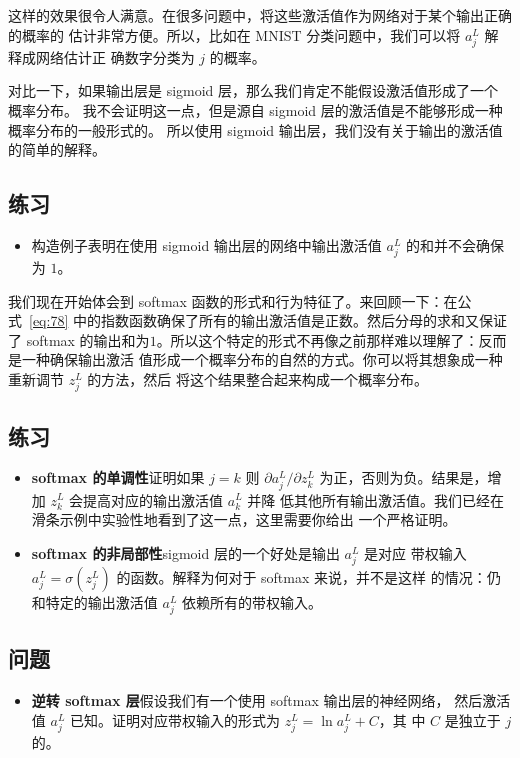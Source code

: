 这样的效果很令人满意。在很多问题中，将这些激活值作为网络对于某个输出正确的概率的
估计非常方便。所以，比如在 MNIST 分类问题中，我们可以将 $a^L_j$ 解释成网络估计正
确数字分类为 $j$ 的概率。

对比一下，如果输出层是 sigmoid 层，那么我们肯定不能假设激活值形成了一个概率分布。
我不会证明这一点，但是源自 sigmoid 层的激活值是不能够形成一种概率分布的一般形式的。
所以使用 sigmoid 输出层，我们没有关于输出的激活值的简单的解释。

\subsection*{练习}

\begin{itemize}
\item 构造例子表明在使用 sigmoid 输出层的网络中输出激活值 $a^L_j$ 的和并不会确保
  为 $1$。
\end{itemize}

我们现在开始体会到 softmax 函数的形式和行为特征了。来回顾一下：在公
式~\eqref{eq:78} 中的指数函数确保了所有的输出激活值是正数。然后分母的求和又保证
了 softmax
的输出和为$1$。所以这个特定的形式不再像之前那样难以理解了：反而是一种确保输出激活
值形成一个概率分布的自然的方式。你可以将其想象成一种重新调节 $z^L_j$ 的方法，然后
将这个结果整合起来构成一个概率分布。

\subsection*{练习}

\begin{itemize}
\item \textbf{softmax 的单调性}\quad 证明如果 $j=k$ 则 $\partial a_j^L/\partial
  z_k^L$ 为正，否则为负。结果是，增加 $z_k^L$ 会提高对应的输出激活值 $a_k^L$ 并降
  低其他所有输出激活值。我们已经在滑条示例中实验性地看到了这一点，这里需要你给出
  一个严格证明。
\item \textbf{softmax 的非局部性}\quad sigmoid 层的一个好处是输出 $a_j^L$ 是对应
  带权输入 $a_j^L = \sigma(z_j^L)$ 的函数。解释为何对于 softmax 来说，并不是这样
  的情况：仍和特定的输出激活值 $a_j^L$ 依赖所有的带权输入。
\end{itemize}

\subsection*{问题}

\begin{itemize}
\item \textbf{逆转 softmax 层}\quad 假设我们有一个使用 softmax 输出层的神经网络，
  然后激活值 $a_j^L$ 已知。证明对应带权输入的形式为 $z_j^L = \ln a_j^L + C$，其
  中 $C$ 是独立于 $j$ 的。
\end{itemize}

